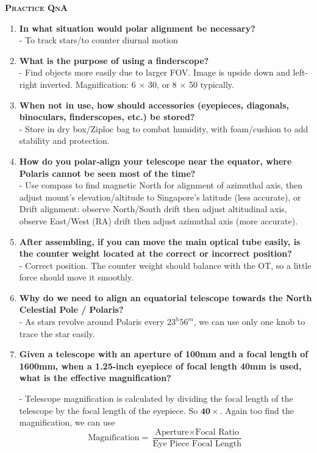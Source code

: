 \documentclass[a4paper,12pt]{extarticle}
\begin{document}
\clearpage
\textsc{\textbf{Practice QnA}}
\begin{enumerate}
	\item \textbf{In what situation would polar alignment be necessary?}\\
	- To track stars/to counter diurnal motion
	\item\textbf{ What is the purpose of using a finderscope?}\\
	- Find objects more easily due to larger FOV. Image is upside down and left-right inverted.
	Magnification: 6 $\times$ 30, or 8 $\times$ 50 typically.
	\item \textbf{When not in use, how should accessories (eyepieces, diagonals, binoculars, finderscopes, etc.) be stored?}\\
	- Store in dry box/Ziploc bag to combat humidity, with foam/cushion to add stability and protection.
	\item \textbf{How do you polar‐align your telescope near the equator, where Polaris cannot be seen most
		of the time?}\\
	
	- Use compass to find magnetic North for alignment of azimuthal axis, then adjust mount's elevation/altitude to Singapore’s latitude  (less accurate), or\\
	
	Drift alignment: observe North/South drift then adjust altitudinal axis, observe East/West (RA) drift then adjust azimuthal axis (more accurate).
	\item  \textbf{After assembling, if you can move the main optical tube easily, is the counter weight located at the correct or incorrect position? }\\
	
	- Correct position. The counter weight should balance with the OT, so a little force should move it smoothly. 
	\item \textbf{Why do we need to align an equatorial telescope towards the North Celestial Pole / Polaris?}\\
	- As stars revolve around Polaris every $23^h56^m$, we can use only one knob to trace the star easily.
	
	\item \textbf{Given a telescope with an aperture of 100mm and a focal length of 1600mm, when a 1.25-inch eyepiece
	of focal length 40mm is used, what is the effective magnification?}

- Telescope magnification is calculated by dividing the focal length of the telescope by the focal
length of the eyepiece. So $\mathbf{40\times}$. Again too find the magnification, we can use
$$\text{Magnification}=\frac{\text{Aperture}\times \text{Focal Ratio}}{\text{Eye Piece Focal Length}}$$


\end{enumerate}
\end{document}
